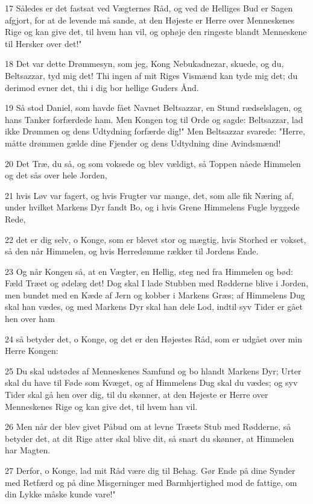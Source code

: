 \par 17 Således er det fastsat ved Vægternes Råd, og ved de Helliges Bud er Sagen afgjort, for at de levende må sande, at den Højeste er Herre over Menneskenes Rige og kan give det, til hvem han vil, og ophøje den ringeste blandt Menneskene til Hersker over det!"
\par 18 Det var dette Drømmesyn, som jeg, Kong Nebukadnezar, skuede, og du, Beltsazzar, tyd mig det! Thi ingen af mit Riges Vismænd kan tyde mig det; du derimod evner det, thi i dig bor hellige Guders Ånd.
\par 19 Så stod Daniel, som havde fået Navnet Beltsazzar, en Stund rædselslagen, og hans Tanker forfærdede ham. Men Kongen tog til Orde og sagde: Beltsazzar, lad ikke Drømmen og dens Udtydning forfærde dig!" Men Beltsazzar svarede: "Herre, måtte drømmen gælde dine Fjender og dens Udtydning dine Avindsmænd!
\par 20 Det Træ, du så, og som voksede og blev vældigt, så Toppen nåede Himmelen og det sås over hele Jorden,
\par 21 hvis Løv var fagert, og hvis Frugter var mange, det, som alle fik Næring af, under hvilket Markens Dyr fandt Bo, og i hvis Grene Himmelens Fugle byggede Rede,
\par 22 det er dig selv, o Konge, som er blevet stor og mægtig, hvis Storhed er vokset, så den når Himmelen, og hvis Herredømme rækker til Jordens Ende.
\par 23 Og når Kongen så, at en Vægter, en Hellig, steg ned fra Himmelen og bød: Fæld Træet og ødelæg det! Dog skal I lade Stubben med Rødderne blive i Jorden, men bundet med en Kæde af Jern og kobber i Markens Græs; af Himmelens Dug skal han vædes, og med Markens Dyr skal han dele Lod, indtil syv Tider er gået hen over ham
\par 24 så betyder det, o Konge, og det er den Højestes Råd, som er udgået over min Herre Kongen:
\par 25 Du skal udstødes af Menneskenes Samfund og bo hlandt Markens Dyr; Urter skal du have til Føde som Kvæget, og af Himmelens Dug skal du vædes; og syv Tider skal gå hen over dig, til du skønner, at den Højeste er Herre over Menneskenes Rige og kan give det, til hvem han vil.
\par 26 Men når der blev givet Påbud om at levne Træets Stub med Rødderne, så betyder det, at dit Rige atter skal blive dit, så snart du skønner, at Himmelen har Magten.
\par 27 Derfor, o Konge, lad mit Råd være dig til Behag. Gør Ende på dine Synder med Retfærd og på dine Misgerninger med Barmhjertighed mod de fattige, om din Lykke måske kunde vare!"
